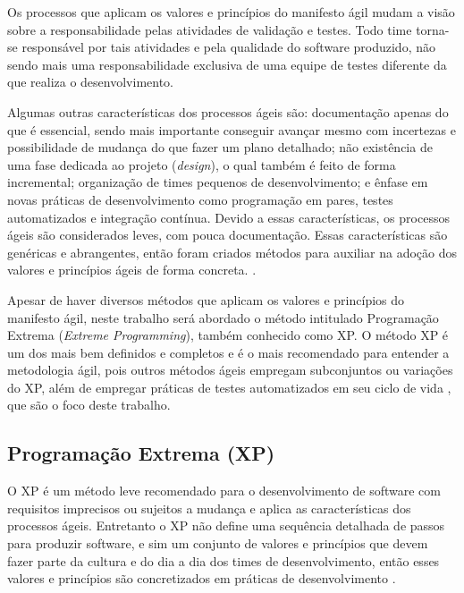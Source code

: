     Os processos que aplicam os valores e princípios do manifesto ágil mudam a visão sobre a responsabilidade pelas atividades de validação e testes. Todo time torna-se responsável por tais atividades e pela qualidade do software produzido, não sendo mais uma responsabilidade exclusiva de uma equipe de testes diferente da que realiza o desenvolvimento.
    
    Algumas outras características dos processos ágeis são: documentação apenas do que é essencial, sendo mais importante conseguir avançar mesmo com incertezas e possibilidade de mudança do que fazer um plano detalhado; não existência de uma fase dedicada ao projeto (\emph{design}), o qual também é feito de forma incremental; organização de times pequenos de desenvolvimento; e ênfase em novas práticas de desenvolvimento como programação em pares, testes automatizados e integração contínua. Devido a essas características, os processos ágeis são considerados leves, com pouca documentação. Essas características são genéricas e abrangentes, então foram criados métodos para auxiliar na adoção dos valores e princípios ágeis de forma concreta. \cite{Valente2020}. 
    
    Apesar de haver diversos métodos que aplicam os valores e princípios do manifesto ágil, neste trabalho será abordado o método intitulado Programação Extrema (\emph{Extreme Programming}), também conhecido como XP. O método XP é um dos mais bem definidos e completos e é o mais recomendado para entender a metodologia ágil, pois outros métodos ágeis empregam subconjuntos ou variações do XP, além de empregar práticas de testes automatizados em seu ciclo de vida \cite{Martin2020}, que são o foco deste trabalho.
        
        \subsection{Programação Extrema (XP)}
        
        O XP é um método leve recomendado para o desenvolvimento de software com requisitos imprecisos ou sujeitos a mudança e aplica as características dos processos ágeis. Entretanto o XP não define uma sequência detalhada de passos para produzir software, e sim um conjunto de valores e princípios que devem fazer parte da cultura e do dia a dia dos times de desenvolvimento, então esses valores e princípios são concretizados em práticas de desenvolvimento \cite{Valente2020}.
        

